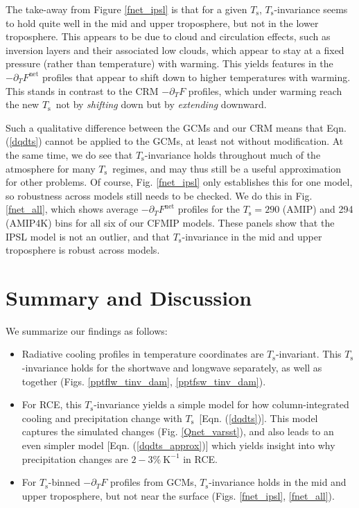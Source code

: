 \documentclass[10pt]{article}
\newcommand{\eqnref}[1]{(\ref{#1})}
\newcommand{\ppt}{\ensuremath{\partial_T}}
\newcommand{\Fnet}{\ensuremath{F^\mathrm{net}}}
\newcommand{\Ts}{\ensuremath{T_\mathrm{s}}}
\newcommand{\Kinverse}{\ensuremath{\mathrm{K^{-1}}}}
\begin{document}
The take-away from Figure \ref{fnet_ipsl} is that for a given \Ts, \Ts-invariance seems to hold quite well in the mid and upper troposphere, but not in the lower troposphere. This appears to be due to cloud and circulation  effects, such as inversion layers and their associated low clouds, which appear to stay at a fixed pressure (rather than temperature) with warming. This yields features in the $-\ppt \Fnet$ profiles that appear to shift down to higher temperatures with  warming. This stands in contrast to the CRM $-\ppt F$ profiles, which under warming reach the new \Ts\ not by \emph{shifting} down but by \emph{extending} downward. 

Such a qualitative difference between the GCMs and our CRM means that Eqn. \eqnref{dqdts} cannot be applied to the GCMs, at least not without modification. At the same time, we do see that \Ts-invariance holds throughout much of the atmosphere for many \Ts\ regimes, and may thus still be a useful approximation for other problems. Of course, Fig. \ref{fnet_ipsl} only establishes this for one model, so robustness across models still needs to be checked. We do this in Fig. \ref{fnet_all}, which shows average $-\ppt \Fnet$ profiles for the $\Ts= 290$ (AMIP) and 294 (AMIP4K) bins  for all six of our  CFMIP models. These panels show that the IPSL model is not an outlier, and that \Ts-invariance in the mid and upper troposphere is robust across models.



\section{Summary and Discussion}
We summarize our findings as follows:
	\begin{itemize}
		\item Radiative cooling profiles in temperature coordinates are  \Ts-invariant. This \Ts-invariance holds for the shortwave and longwave separately, as well as together (Figs. \ref{pptflw_tinv_dam}, \ref{pptfsw_tinv_dam}).
		\item For RCE, this \Ts-invariance yields a simple model for how column-integrated cooling and  precipitation change with \Ts\ [Eqn. \eqnref{dqdts}]. This model captures the simulated changes (Fig. \ref{Qnet_varsst}), and also leads to an even simpler model [Eqn. \eqnref{dqdts_approx}] which yields insight into why precipitation changes are  $2 -3\%\ \Kinverse$ in RCE.
		\item For \Ts-binned $-\ppt F$ profiles from GCMs, \Ts-invariance holds in the mid and upper troposphere, but not near the surface (Figs. \ref{fnet_ipsl}, \ref{fnet_all}).
	\end{itemize}
		
\end{document}
